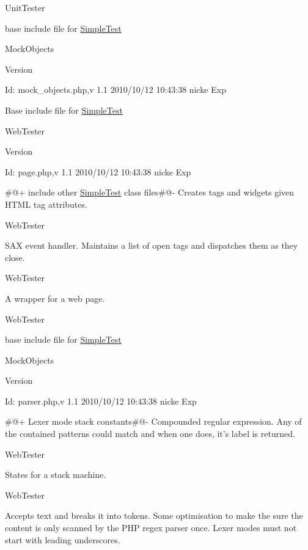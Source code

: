 UnitTester

base include file for \hyperlink{class_simple_test}{SimpleTest}

MockObjects \begin{DoxyVersion}{Version}

\end{DoxyVersion}
\begin{DoxyParagraph}{Id:}
mock\_\-objects.php,v 1.1 2010/10/12 10:43:38 nicke Exp 
\end{DoxyParagraph}


Base include file for \hyperlink{class_simple_test}{SimpleTest}

WebTester \begin{DoxyVersion}{Version}

\end{DoxyVersion}
\begin{DoxyParagraph}{Id:}
page.php,v 1.1 2010/10/12 10:43:38 nicke Exp 
\end{DoxyParagraph}


\#@+ include other \hyperlink{class_simple_test}{SimpleTest} class files\#@-\/ Creates tags and widgets given HTML tag attributes.

WebTester

SAX event handler. Maintains a list of open tags and dispatches them as they close.

WebTester

A wrapper for a web page.

WebTester

base include file for \hyperlink{class_simple_test}{SimpleTest}

MockObjects \begin{DoxyVersion}{Version}

\end{DoxyVersion}
\begin{DoxyParagraph}{Id:}
parser.php,v 1.1 2010/10/12 10:43:38 nicke Exp 
\end{DoxyParagraph}


\#@+ Lexer mode stack constants\#@-\/ Compounded regular expression. Any of the contained patterns could match and when one does, it's label is returned.

WebTester

States for a stack machine.

WebTester

Accepts text and breaks it into tokens. Some optimisation to make the sure the content is only scanned by the PHP regex parser once. Lexer modes must not start with leading underscores.

